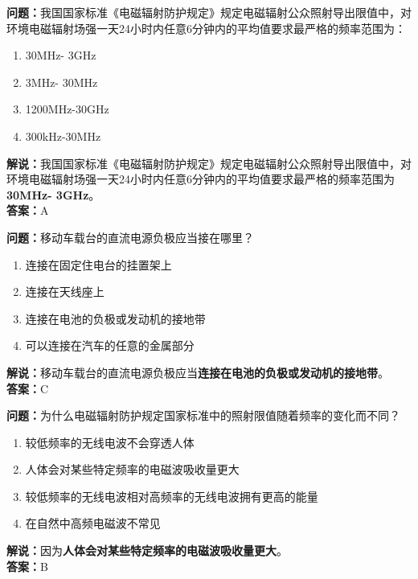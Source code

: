 \bigskip


\noindent\textbf{问题：}我国国家标准《电磁辐射防护规定》规定电磁辐射公众照射导出限值中，对环境电磁辐射场强一天24小时内任意6分钟内的平均值要求最严格的频率范围为：
\begin{enumerate}[label=\Alph*), leftmargin=3em]
	\item 30MHz- 3GHz
	\item 3MHz- 30MHz
	\item 1200MHz-30GHz
	\item 300kHz-30MHz
\end{enumerate}
\noindent\textbf{解说：}我国国家标准《电磁辐射防护规定》规定电磁辐射公众照射导出限值中，对环境电磁辐射场强一天24小时内任意6分钟内的平均值要求最严格的频率范围为\textbf{30MHz- 3GHz}。\\
\textbf{答案：}A

\bigskip


\noindent\textbf{问题：}移动车载台的直流电源负极应当接在哪里？
\begin{enumerate}[label=\Alph*), leftmargin=3em]
	\item 连接在固定住电台的挂置架上
	\item 连接在天线座上
	\item 连接在电池的负极或发动机的接地带
	\item 可以连接在汽车的任意的金属部分
\end{enumerate}
\noindent\textbf{解说：}移动车载台的直流电源负极应当\textbf{连接在电池的负极或发动机的接地带}。\\
\textbf{答案：}C

\bigskip


\noindent\textbf{问题：}为什么电磁辐射防护规定国家标准中的照射限值随着频率的变化而不同？
\begin{enumerate}[label=\Alph*), leftmargin=3em]
	\item 较低频率的无线电波不会穿透人体
	\item 人体会对某些特定频率的电磁波吸收量更大
	\item 较低频率的无线电波相对高频率的无线电波拥有更高的能量
	\item 在自然中高频电磁波不常见
\end{enumerate}
\noindent\textbf{解说：}因为\textbf{人体会对某些特定频率的电磁波吸收量更大}。\\
\textbf{答案：}B
